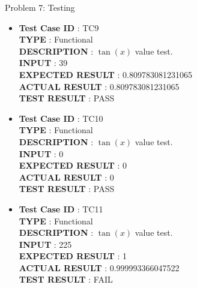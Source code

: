 \documentclass[a4paper,12pt]{article}
\begin{document}
\begin{section}{Problem 7: Testing}
\begin{itemize}
\item \textbf{Test Case ID} \hspace{1.85cm} : TC9  \\
\textbf{TYPE } \hspace{3.05cm}  : Functional\\
\textbf{DESCRIPTION }\hspace{1.15cm} : $\tan(x)$ value test. \\
\textbf{INPUT} \hspace{3.05cm} :  39 \\
\textbf{EXPECTED RESULT} \hspace{0.01cm} : 0.809783081231065 \\
\textbf{ACTUAL RESULT} \hspace{0.6cm} : 0.809783081231065 \\
\textbf{TEST RESULT} \hspace{1.45cm} : PASS \\

\item \textbf{Test Case ID} \hspace{1.85cm} : TC10  \\
\textbf{TYPE } \hspace{3.05cm}  : Functional\\
\textbf{DESCRIPTION }\hspace{1.15cm} : $\tan(x)$ value test. \\
\textbf{INPUT} \hspace{3.05cm} :  0 \\
\textbf{EXPECTED RESULT} \hspace{0.01cm} : 0 \\
\textbf{ACTUAL RESULT} \hspace{0.6cm} : 0 \\
\textbf{TEST RESULT} \hspace{1.45cm} : PASS \\	

\item \textbf{Test Case ID} \hspace{1.85cm} : TC11 \\
\textbf{TYPE } \hspace{3.05cm}  : Functional\\
\textbf{DESCRIPTION }\hspace{1.15cm} : $\tan(x)$ value test. \\
\textbf{INPUT} \hspace{3.05cm} :  225 \\
\textbf{EXPECTED RESULT} \hspace{0.01cm} : 1 \\
\textbf{ACTUAL RESULT} \hspace{0.6cm} : 0.999993366047522 \\
\textbf{TEST RESULT} \hspace{1.45cm} : FAIL \\



\end{itemize}
\end{section}
\end{document}
